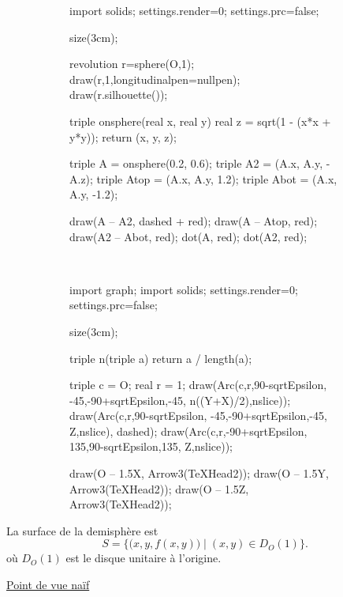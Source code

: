 \begin{figure}[H]
	\centering
	\begin{subfigure}{3cm}
		\centering
		\begin{asy}
			import solids;
			settings.render=0;
			settings.prc=false;

			size(3cm);

			revolution r=sphere(O,1);
			draw(r,1,longitudinalpen=nullpen);
			draw(r.silhouette());

			triple onsphere(real x, real y) {
				real z = sqrt(1 - (x*x + y*y));
				return (x, y, z);
			}

			triple A = onsphere(0.2, 0.6);
			triple A2 = (A.x, A.y, -A.z);
			triple Atop = (A.x, A.y, 1.2);
			triple Abot = (A.x, A.y, -1.2);

			draw(A -- A2, dashed + red);
			draw(A -- Atop, red);
			draw(A2 -- Abot, red);
			dot(A, red);
			dot(A2, red);
		\end{asy}
	\end{subfigure}
	\begin{subfigure}
		{1cm}~\\ %
	\end{subfigure}
	\begin{subfigure}{3cm}
		\centering
		\begin{asy}
			import graph;
			import solids;
			settings.render=0;
			settings.prc=false;

			size(3cm);

			triple n(triple a) { return a / length(a); }

			triple c = O;
			real r = 1;
			draw(Arc(c,r,90-sqrtEpsilon, -45,-90+sqrtEpsilon,-45, n((Y+X)/2),nslice));
			draw(Arc(c,r,90-sqrtEpsilon, -45,-90+sqrtEpsilon,-45, Z,nslice), dashed);
			draw(Arc(c,r,-90+sqrtEpsilon, 135,90-sqrtEpsilon,135, Z,nslice));


			draw(O -- 1.5X, Arrow3(TeXHead2));
			draw(O -- 1.5Y, Arrow3(TeXHead2));
			draw(O -- 1.5Z, Arrow3(TeXHead2));
		\end{asy}
	\end{subfigure}
\end{figure}

La surface de la demisphère est \[
	S = \big\{\big(x,y,f(x,y)\big)  \mid (x,y) \in D_O(1) \big\}.
\] où $D_O(1)$ est le disque unitaire à l'origine.

\vspace{2mm}
\begin{center}
	\underline{\Large \sc Point de vue naïf}
\end{center}
\vspace{2mm}

